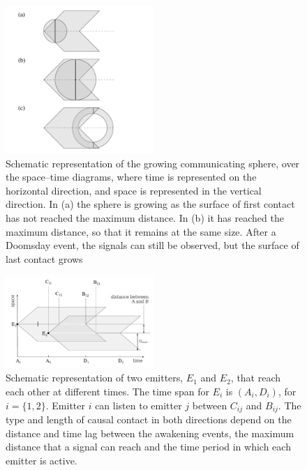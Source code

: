 \documentclass[crop]{CSLB}%
\begin{document}
                   

\begin{figure}
   \centering
   \includegraphics[width=0.5\textwidth]{growingsphere.pdf}
   \caption{Schematic representation of the growing communicating
   sphere, over the space--time diagrams, where time is represented on
   the horizontal direction, and space is represented in the vertical
   direction.  In (a) the sphere is
   growing as the surface of first contact has not reached the maximum
   distance.  In (b) it has reached the maximum distance, so that it
   remains at the same size.  After a Doomsday event, the signals can
   still be observed, but the surface of last contact grows }
   \label{F_sphere}
\end{figure}

  
\begin{figure}
   \centering
   \includegraphics[width=0.5\textwidth]{abcd.pdf}
   \caption{Schematic representation of two emitters, $E_1$ and $E_2$,
   that reach each other at different times.  The time span for $E_i$
   is $(A_i, D_i)$, for $i=\{1,2\}$.  Emitter $i$ can listen to
   emitter $j$ between $C_{ij}$ and $B_{ij}$.
   The type and length of causal contact in both directions depend on
   the distance and time lag between the awakening events, the maximum
   distance that a signal can reach and the time period in which each
   emitter is active.}
   \label{F_abcd}
\end{figure}
                     
\end{document}
